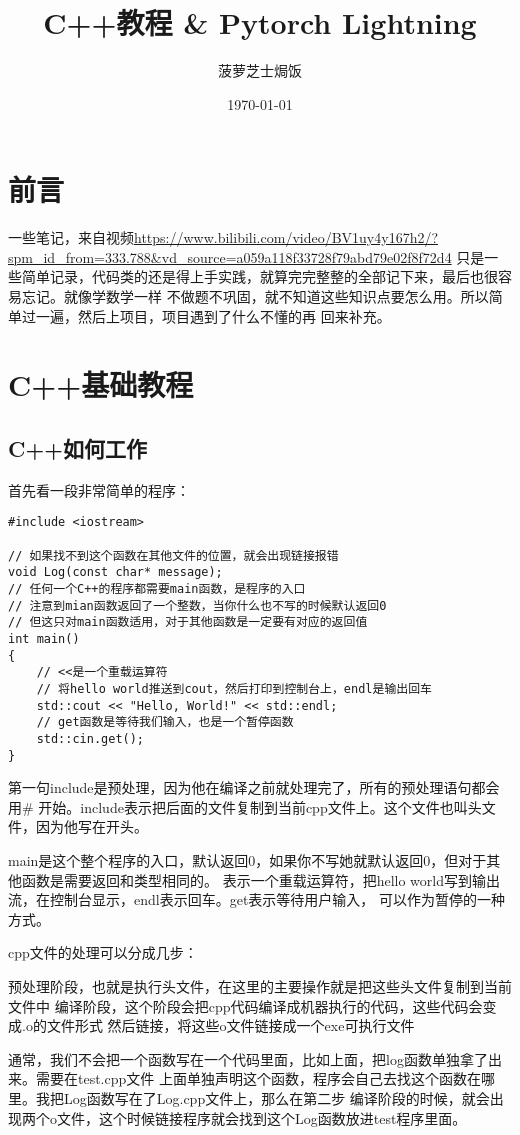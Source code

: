 \documentclass{article}
\title{C++教程 \& Pytorch Lightning}
\author{菠萝芝士焗饭}
\date{\today}
\begin{document}
\begin{sloppypar}

\maketitle
\tableofcontents

\section{前言}
一些笔记，来自视频\url{https://www.bilibili.com/video/BV1uy4y167h2/?spm_id_from=333.788&vd_source=a059a118f33728f79abd79e02f8f72d4}
只是一些简单记录，代码类的还是得上手实践，就算完完整整的全部记下来，最后也很容易忘记。就像学数学一样
不做题不巩固，就不知道这些知识点要怎么用。所以简单过一遍，然后上项目，项目遇到了什么不懂的再
回来补充。

\section{C++基础教程}

\subsection{C++如何工作}
首先看一段非常简单的程序：
\begin{lstlisting}
#include <iostream>

// 如果找不到这个函数在其他文件的位置，就会出现链接报错
void Log(const char* message);
// 任何一个C++的程序都需要main函数，是程序的入口
// 注意到mian函数返回了一个整数，当你什么也不写的时候默认返回0
// 但这只对main函数适用，对于其他函数是一定要有对应的返回值
int main()
{
    // <<是一个重载运算符
    // 将hello world推送到cout，然后打印到控制台上，endl是输出回车
    std::cout << "Hello, World!" << std::endl;
    // get函数是等待我们输入，也是一个暂停函数 
    std::cin.get();
}
\end{lstlisting}
第一句include是预处理，因为他在编译之前就处理完了，所有的预处理语句都会用\#
开始。include表示把后面的文件复制到当前cpp文件上。这个文件也叫头文件，因为他写在开头。

main是这个整个程序的入口，默认返回0，如果你不写她就默认返回0，但对于其他函数是需要返回和类型相同的。
\text{<<}表示一个重载运算符，把hello world写到输出流，在控制台显示，endl表示回车。get表示等待用户输入，
可以作为暂停的一种方式。

cpp文件的处理可以分成几步：
\begin{outline}
	\1 预处理阶段，也就是执行头文件，在这里的主要操作就是把这些头文件复制到当前文件中
	\1 编译阶段，这个阶段会把cpp代码编译成机器执行的代码，这些代码会变成.o的文件形式
	\1 然后链接，将这些o文件链接成一个exe可执行文件
\end{outline}
通常，我们不会把一个函数写在一个代码里面，比如上面，把log函数单独拿了出来。需要在test.cpp文件
上面单独声明这个函数，程序会自己去找这个函数在哪里。我把Log函数写在了Log.cpp文件上，那么在第二步
编译阶段的时候，就会出现两个o文件，这个时候链接程序就会找到这个Log函数放进test程序里面。


\end{sloppypar}
\end{document}
